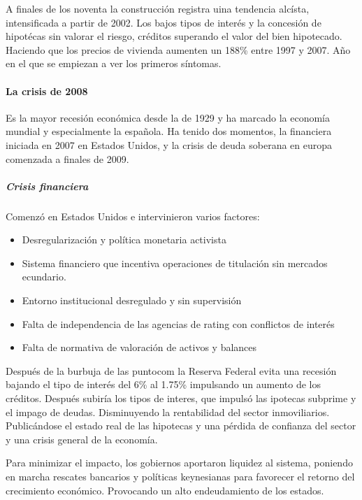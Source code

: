             A finales de los noventa la construcción registra uina tendencia alcísta, intensificada a partir de 2002. Los bajos tipos de interés y la concesión de hipotécas sin valorar el riesgo, créditos superando el valor del bien hipotecado. Haciendo que los precios de vivienda aumenten un 188\% entre 1997 y 2007. Año en el que se empiezan a ver los primeros síntomas.

        \paragraph{La crisis de 2008} %
            Es la mayor recesión económica desde la de 1929 y ha marcado la economía mundial y especialmente la española. Ha tenido dos momentos, la financiera iniciada en 2007 en Estados Unidos, y la crisis de deuda soberana en europa comenzada a finales de 2009.

            \subparagraph{Crisis financiera} %
                Comenzó en Estados Unidos e intervinieron varios factores:
                \begin{itemize}
                    \item Desregularización y política monetaria activista
                    \item Sistema financiero que incentiva operaciones de titulación sin mercados ecundario.
                    \item Entorno institucional desregulado y sin supervisión
                    \item Falta de independencia de las agencias de rating con conflictos de interés
                    \item Falta de normativa de valoración de activos y balances
                \end{itemize}

                Después de la burbuja de las puntocom la Reserva Federal evita una recesión bajando el tipo de interés del 6\% al 1.75\% impulsando un aumento de los créditos. Después subiría los tipos de interes, que impulsó las ipotecas subprime y el impago de deudas. Disminuyendo la rentabilidad del sector inmoviliarios. Publicándose el estado real de las hipotecas y una pérdida de confianza del sector y una crisis general de la economía.

                Para minimizar el impacto, los gobiernos aportaron liquidez al sistema, poniendo en marcha rescates bancarios y políticas keynesianas para favorecer el retorno del crecimiento económico. Provocando un alto endeudamiento de los estados.


